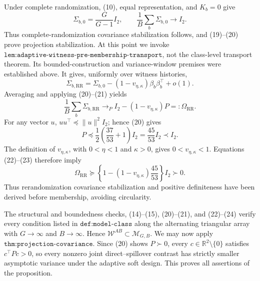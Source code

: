 Under complete randomization, (10), equal representation, and \(K_b=0\) give
\[
 \Sigma_{b,0}=\frac G{G-1}I_2,
 \qquad
 \frac1B\sum_b\Sigma_{b,0}\longrightarrow I_2.            \tag{21}
\]
Thus complete-randomization covariance stabilization follows, and (19)--(20) prove projection stabilization.  At this point we invoke \(\texttt{lem:adaptive-witness-pre-membership-transport}\), not the class-level transport theorem.  Its bounded-construction and variance-window premises were established above.  It gives, uniformly over witness histories,
\[
 \Sigma_{b,\mathrm{RR}}
 =\Sigma_{b,0}-(1-v_{\eta,\kappa})\beta_b\beta_b^\top+o(1).
\]
Averaging and applying (20)--(21) yields
\[
 \frac1B\sum_b\Sigma_{b,\mathrm{RR}}
 \longrightarrow_P I_2-(1-v_{\eta,\kappa})P
 =:\Omega_{\mathrm{RR}}.                                   \tag{22}
\]
For any vector \(u\), \(uu^\top\preceq\|u\|^2I_2\); hence (20) gives
\[
 P\preceq\frac12\left(\frac{37}{53}+1\right)I_2
 =\frac{45}{53}I_2\prec I_2.                               \tag{23}
\]
The definition of \(v_{\eta,\kappa}\), with \(0<\eta<1\) and \(\kappa>0\), gives \(0<v_{\eta,\kappa}<1\).  Equations (22)--(23) therefore imply
\[
 \Omega_{\mathrm{RR}}
 \succeq\left\{1-(1-v_{\eta,\kappa})\frac{45}{53}\right\}I_2
 \succ0.                                                    \tag{24}
\]
Thus rerandomization covariance stabilization and positive definiteness have been derived before membership, avoiding circularity.

The structural and boundedness checks, (14)--(15), (20)--(21), and (22)--(24) verify every condition listed in \(\texttt{def:model-class}\) along the alternating triangular array with \(G\to\infty\) and \(B\to\infty\).  Hence \(\mathcal W^{AB}\subset\mathcal M_{G,B}\).  We may now apply \(\texttt{thm:projection-covariance}\).  Since (20) shows \(P\succ0\), every \(c\in\mathbb R^2\setminus\{0\}\) satisfies \(c^\top Pc>0\), so every nonzero joint direct--spillover contrast has strictly smaller asymptotic variance under the adaptive soft design.  This proves all assertions of the proposition.